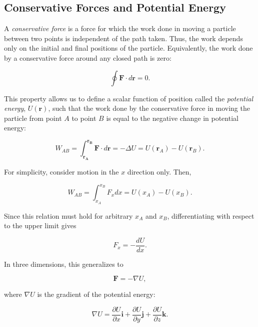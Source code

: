 \documentclass[../main.tex]{subfiles}
\begin{document}
\subsection{Conservative Forces and Potential Energy}

A \emph{conservative force} is a force for which the work done in moving a particle between two points is independent of the path taken. Thus, the work depends only on the initial and final positions of the particle. Equivalently, the work done by a conservative force around any closed path is zero:

\begin{equation}
\oint \mathbf{F}\cdot d\mathbf{r} = 0.
\end{equation}

This property allows us to define a scalar function of position called the \emph{potential energy}, $U(\mathbf{r})$, such that the work done by the conservative force in moving the particle from point $A$ to point $B$ is equal to the negative change in potential energy:

\begin{equation}
W_{AB}
= \int_\mathbf{r_A}^{\mathbf{r_B}} \mathbf{F}\cdot d\mathbf{r}
= -\Delta U
= U(\mathbf{r}_A)-U(\mathbf{r}_B).
\end{equation}

For simplicity, consider motion in the $x$ direction only. Then,

\begin{equation}
W_{AB}
= \int_{x_A}^{x_B} F_xdx
= U(x_A)-U(x_B).
\end{equation}

Since this relation must hold for arbitrary $x_A$ and $x_B$, differentiating with respect to the upper limit gives

\begin{equation}
F_x = -\frac{dU}{dx}.
\end{equation}

In three dimensions, this generalizes to

\begin{equation}
\mathbf{F} = -\nabla U,
\end{equation}

where $\nabla U$ is the gradient of the potential energy:

\begin{equation}
\nabla U
= \frac{\partial U}{\partial x}\mathbf{i}
+ \frac{\partial U}{\partial y}\mathbf{j}
+ \frac{\partial U}{\partial z}\mathbf{k}.
\end{equation}
\end{document}
